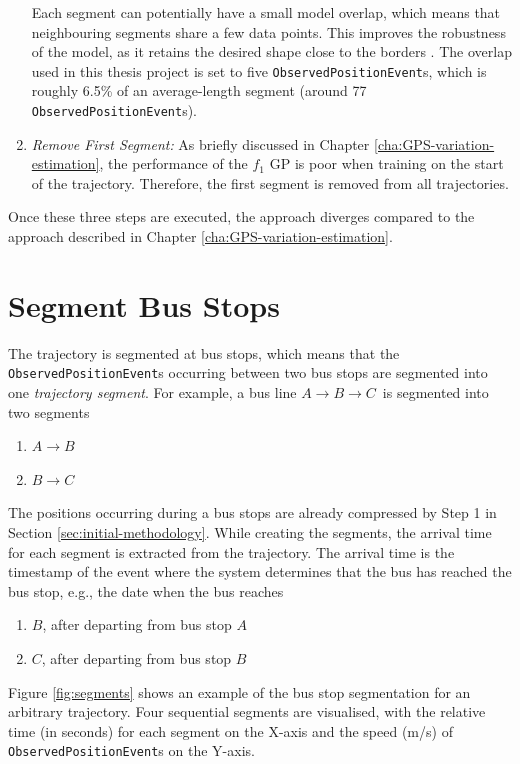 \begin{enumerate}
    Each segment can potentially have a small model overlap, which means that neighbouring segments share a few data points.
    This improves the robustness of the model, as it retains the desired shape close to the borders \cite{Tiger2018-gp-motion-pattern}.
    The overlap used in this thesis project is set to five \texttt{ObservedPositionEvent}s, which is roughly 6.5\% of an average-length segment (around 77 \texttt{ObservedPositionEvent}s).

    \item \textit{Remove First Segment:}
    As briefly discussed in Chapter \ref{cha:GPS-variation-estimation}, the performance of the $f_1$ GP is poor when training on the start of the trajectory.
    Therefore, the first segment is removed from all trajectories.

\end{enumerate}

Once these three steps are executed, the approach diverges compared to the approach described in Chapter \ref{cha:GPS-variation-estimation}.

\section{Segment Bus Stops}
The trajectory is segmented at bus stops, which means that the \texttt{ObservedPositionEvent}s occurring between two bus stops are segmented into one \textit{trajectory segment}.
For example, a bus line $A\rightarrow B\rightarrow C$ is segmented into two segments
\begin{enumerate}
    \item $A\rightarrow B$
    \item $B\rightarrow C$
\end{enumerate}
The positions occurring during a bus stops are already compressed by Step 1 in Section \ref{sec:initial-methodology}.
While creating the segments, the arrival time for each segment is extracted from the trajectory.
The arrival time is the timestamp of the event where the system determines that the bus has reached the bus stop, e.g., the date when the bus reaches 
\begin{enumerate}
    \item $B$, after departing from bus stop $A$
    \item $C$, after departing from bus stop $B$
\end{enumerate}

Figure \ref{fig:segments} shows an example of the bus stop segmentation for an arbitrary trajectory.
Four sequential segments are visualised, with the relative time (in seconds) for each segment on the X-axis and the speed (m/s) of \texttt{ObservedPositionEvent}s on the Y-axis.

